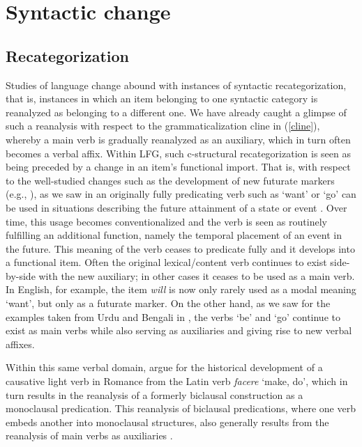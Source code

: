\documentclass[output=paper,hidelinks]{langscibook}
\begin{document}
\section{Syntactic change}
\label{sec:Historical:syn-change}
\subsection{Recategorization}
\label{sec:Historical:recat}

Studies of language change abound with instances of syntactic recategorization, that is, instances in which an item belonging to one syntactic category is reanalyzed as belonging to a different one. We have already caught a glimpse of such a reanalysis with respect to the grammaticalization cline in (\ref{cline}), whereby a main verb is gradually reanalyzed as an auxiliary, which in turn often becomes a verbal affix. Within LFG, such c-structural recategorization is seen as being preceded by a change in an item's functional import.  That is, with respect to the well-studied changes such as the development of new futurate markers (e.g., \citealt{fleischman09}), as we saw in  an originally fully predicating verb such as `want' or `go' can be used in situations describing the future attainment of a state or event \citep{BorjarsVincent2019}. Over time, this usage becomes conventionalized and the verb is seen as routinely fulfilling an additional function, namely the temporal placement of an event in the future.  This meaning of the verb ceases to predicate fully and it develops into a functional item.  Often the original lexical/content verb continues to exist side-by-side with the new auxiliary; in other cases it ceases to be used as a main verb.  In English, for example, the item \textit{will} is now only rarely used as a modal meaning `want', but only as a futurate marker.  On the other hand, as we saw for the examples taken from Urdu and Bengali in , the verbs `be' and `go' continue to exist as main verbs while also serving as auxiliaries and giving rise to new verbal affixes. 

Within this same verbal domain, \citet{borjars2017lexical}  argue for the historical  development of a causative light verb in Romance from the Latin verb \textit{facere} `make, do', which in turn results in the reanalysis of a formerly biclausal construction as a monoclausal predication.  This reanalysis of biclausal predications, where one verb embeds another into monoclausal structures, also generally results from the reanalysis of main verbs as auxiliaries \citep{butt-etal2004,Butt2010}. 
\end{document}

